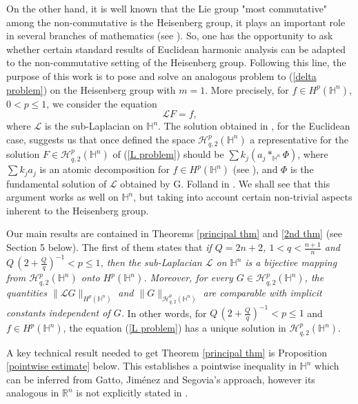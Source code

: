 \documentclass[reqno,10pt]{article}
\theoremstyle{definition}
\numberwithin{equation}{section}
\numberwithin{theorem}{section}
\begin{document}
On the other hand, it is well known that the Lie group "most commutative" among the non-commutative is the Heisenberg group, it plays an important role in several branches of mathematics (see \cite{Thangavelu}). So, one has the opportunity to ask whether certain standard 
results of Euclidean harmonic analysis can be adapted to the non-commutative setting of the Heisenberg group. Following this line, the 
purpose of this work is to pose and solve an analogous problem to (\ref{delta problem}) on the Heisenberg group with $m=1$. More precisely, for $f \in H^p(\mathbb{H}^n)$, $0 < p \leq 1$, we consider the equation
\begin{equation} \label{L problem}
\mathcal{L} F = f,
\end{equation}
where $\mathcal{L}$ is the sub-Laplacian on $\mathbb{H}^{n}$. The solution obtained in \cite{segovia}, for the Euclidean case, 
suggests us that once defined the space $\mathcal{H}^{p}_{q, 2}(\mathbb{H}^{n})$ a representative for the solution 
$F \in \mathcal{H}^{p}_{q, 2}(\mathbb{H}^{n})$ of (\ref{L problem}) should be $\sum k_j (a_j \ast_{\mathbb{H}^n} \Phi)$, where
$\sum k_j a_j$ is an atomic decomposition for $f \in H^p(\mathbb{H}^{n})$ (see \cite{Foll-St}), and $\Phi$ is the fundamental 
solution of $\mathcal{L}$ obtained by G. Folland in \cite{Folland}. We shall see that this argument works as well on $\mathbb{H}^n$, 
but taking into account certain non-trivial aspects inherent to the Heisenberg group.


Our main results are contained in Theorems \ref{principal thm} and \ref{2nd thm} (see Section 5 below). The first of them 
states that \textit{if $Q=2n+2$, $1 < q < \frac{n+1}{n}$ and $Q \, (2 + \frac{Q}{q})^{-1} < p \leq 1$, then the sub-Laplacian $\mathcal{L}$ 
on $\mathbb{H}^n$ is a bijective mapping from $\mathcal{H}^{p}_{q, 2}(\mathbb{H}^{n})$ onto $H^{p}(\mathbb{H}^{n})$. Moreover, for every 
$G \in \mathcal{H}^{p}_{q, 2}(\mathbb{H}^{n})$, the quantities $\| \mathcal{L}G \|_{H^{p}(\mathbb{H}^{n})}$ and
$\|G \|_{\mathcal{H}^{p}_{q, 2}(\mathbb{H}^{n})}$ are comparable with implicit constants independent of $G$.} In other words, for 
$Q \, (2 + \frac{Q}{q})^{-1} < p \leq 1$ and $f \in H^p(\mathbb{H}^n)$, the equation (\ref{L problem}) has a unique solution in 
$\mathcal{H}^{p}_{q, 2}(\mathbb{H}^{n})$.

A key technical result needed to get Theorem \ref{principal thm} is Proposition \ref{pointwise estimate} below. This establishes a pointwise inequality in $\mathbb{H}^n$ which can be inferred from Gatto, Jim\'enez and Segovia's approach, however its analogous in $\mathbb{R}^n$ is not explicitly stated in \cite{segovia}. 
\end{document}
